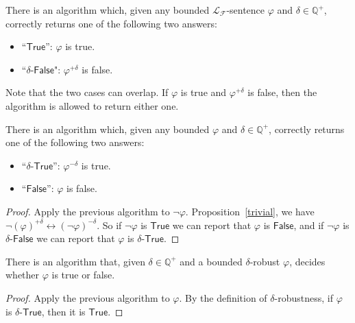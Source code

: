 \documentclass[prodmode]{acmsmall} %
\begin{document}
\begin{theorem}\label{main}
There is an algorithm which, given any bounded $\mathcal{L}_{\mathcal{F}}$-sentence $\varphi$ and $\delta\in \mathbb{Q}^+$, correctly returns one of the following two answers:
\begin{itemize}
\item ``$\mathsf{True}$'': $\varphi$ is true. 
\item ``$\delta$-$\mathsf{False}$": $\varphi^{+\delta}$ is false. 
\end{itemize}
\end{theorem}

Note that the two cases can overlap. If $\varphi$ is true and $\varphi^{+\delta}$ is false, then the algorithm is allowed to return either one. 

\begin{corollary}
There is an algorithm which, given any bounded $\varphi$ and $\delta\in \mathbb{Q}^+$, correctly returns one of the following two answers:
\begin{itemize}
\item ``$\delta$-$\mathsf{True}$'': $\varphi^{-\delta}$ is true. 
\item ``$\mathsf{False}$'': $\varphi$ is false. 
\end{itemize} 
\end{corollary}

\begin{proof}
Apply the previous algorithm to $\neg\varphi$. Proposition~\ref{trivial}, we have $\neg(\varphi)^{+\delta}\leftrightarrow (\neg\varphi)^{-\delta}$. So if $\neg\varphi$ is $\mathsf{True}$ we can report that $\varphi$ is $\mathsf{False}$, and if $\neg\varphi$ is $\delta$-$\mathsf{False}$ we can report that $\varphi$ is $\delta$-$\mathsf{True}$.
\end{proof}

\begin{corollary}\label{point}
There is an algorithm that, given $\delta\in \mathbb{Q}^+$ and a bounded $\delta$-robust $\varphi$, decides whether $\varphi$ is true or false. 
\end{corollary}

\begin{proof}
Apply the previous algorithm to $\varphi$. By the definition of $\delta$-robustness, if $\varphi$ is $\delta$-$\mathsf{True}$, then it is $\mathsf{True}$.  
\end{proof}
\end{document}
